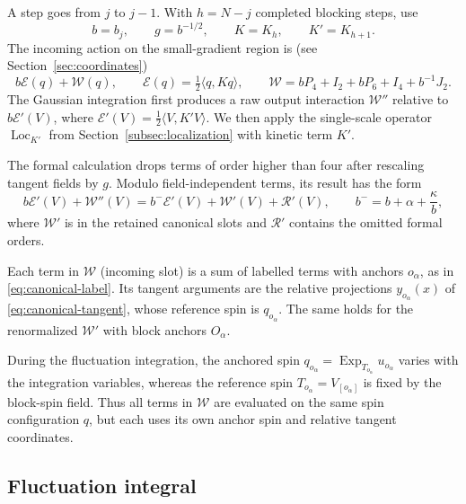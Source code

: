 \documentclass[11pt]{article}
\newcommand{\Exp}{\operatorname{Exp}}
\newcommand{\Loc}{\operatorname{Loc}}
\numberwithin{equation}{section}
\theoremstyle{definition}
\theoremstyle{plain}
\begin{document}
A step goes from $j$ to $j-1$.  With $h=N-j$ completed blocking
steps, use
\begin{equation}
 b=b_j,\qquad g=b^{-1/2},\qquad K=K_h,\qquad K'=K_{h+1}.
\end{equation}
The incoming action on the small-gradient region is (see Section~\ref{sec:coordinates})
\begin{equation}
 b\mathcal E(q)+\mathcal W(q),\qquad
 \mathcal E(q)=\tfrac12\langle q,Kq\rangle,\qquad
 \mathcal W=bP_4+I_2+bP_6+I_4+b^{-1}J_2.
\end{equation}
The Gaussian integration first produces a raw output interaction
$\mathcal W''$ relative to $b\mathcal E'(V)$, where
$\mathcal E'(V)=\tfrac12\langle V,K'V\rangle$.
We then apply the single-scale operator $\Loc_{K'}$ from
Section~\ref{subsec:localization} with kinetic term $K'$.

The formal calculation drops terms of order higher than four after
rescaling tangent fields by $g$.  Modulo field-independent
terms, its result has the form
\begin{equation}
 b\mathcal E'(V)+\mathcal W''(V)
 =b^-\mathcal E'(V)+\mathcal W'(V)+\mathcal R'(V),
 \qquad b^-=b+\alpha+\frac{\kappa}{b},
 \label{eq:pert-formal-reassembly}
\end{equation}
where $\mathcal W'$ is in the retained canonical slots and
$\mathcal R'$ contains the omitted formal orders.

Each term in $\mathcal W$ (incoming slot) is a sum of labelled terms with
anchors $o_\alpha$, as in \eqref{eq:canonical-label}.
Its tangent arguments are the relative projections
$y_{o_\alpha}(x)$ of \eqref{eq:canonical-tangent}, whose
reference spin is $q_{o_\alpha}$. 
%
The same holds for the renormalized $\mathcal W'$ with block anchors $O_\alpha$.

During the fluctuation integration, the anchored spin
$q_{o_\alpha}=\Exp_{T_{o_\alpha}}u_{o_\alpha}$ varies with the
integration variables, whereas the reference spin $T_{o_\alpha}=V_{[o_\alpha]}$
is fixed by the block-spin field.  Thus all terms in $\mathcal W$
are evaluated on the same spin configuration $q$,
but each uses its own anchor spin and relative tangent coordinates.

\subsection{Fluctuation integral}
\end{document}
